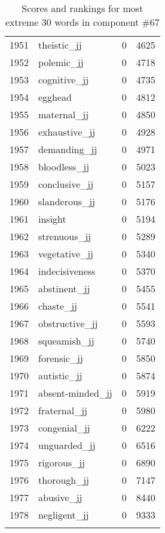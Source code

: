 \begin{longtable}[!htbp]{| rlr@{.}l |}
    1951 & theistic\_jj & 0 & 4625 \\
    1952 & polemic\_jj & 0 & 4718 \\
    1953 & cognitive\_jj & 0 & 4735 \\
    1954 & egghead & 0 & 4812 \\
    1955 & maternal\_jj & 0 & 4850 \\
    1956 & exhaustive\_jj & 0 & 4928 \\
    1957 & demanding\_jj & 0 & 4971 \\
    1958 & bloodless\_jj & 0 & 5023 \\
    1959 & conclusive\_jj & 0 & 5157 \\
    1960 & slanderous\_jj & 0 & 5176 \\
    1961 & insight & 0 & 5194 \\
    1962 & strenuous\_jj & 0 & 5289 \\
    1963 & vegetative\_jj & 0 & 5340 \\
    1964 & indecisiveness & 0 & 5370 \\
    1965 & abstinent\_jj & 0 & 5455 \\
    1966 & chaste\_jj & 0 & 5541 \\
    1967 & obstructive\_jj & 0 & 5593 \\
    1968 & squeamish\_jj & 0 & 5740 \\
    1969 & forensic\_jj & 0 & 5850 \\
    1970 & autistic\_jj & 0 & 5874 \\
    1971 & absent-minded\_jj & 0 & 5919 \\
    1972 & fraternal\_jj & 0 & 5980 \\
    1973 & congenial\_jj & 0 & 6222 \\
    1974 & unguarded\_jj & 0 & 6516 \\
    1975 & rigorous\_jj & 0 & 6890 \\
    1976 & thorough\_jj & 0 & 7147 \\
    1977 & abusive\_jj & 0 & 8440 \\
    1978 & negligent\_jj & 0 & 9333 \\
    \hline
    \caption{Scores and rankings for most extreme 30 words in component \#67} \\
\end{longtable}
